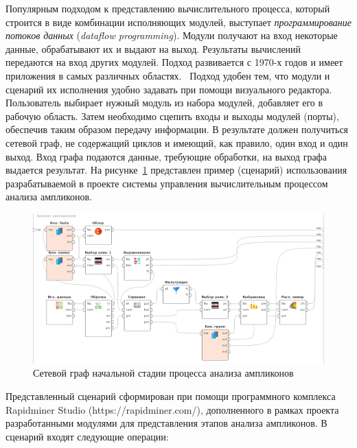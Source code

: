 \documentclass[a4paper,12pt,openany,final]{extreport}
\def\oldcaption{} \let\oldcaption=\caption
\def\caption{\stepcounter{captionsnum}\oldcaption}
\begin{document}
Популярным подходом к представлению вычислительного процесса, который
строится в виде комбинации исполняющих модулей, выступает
\emph{программирование потоков данных} (\emph{dataflow programming}).
Модули получают на вход некоторые данные, обрабатывают их и выдают на
выход. Результаты вычислений передаются на вход других модулей. Подход
развивается с 1970-х годов и имеет приложения в самых различных
областях. ~Подход удобен тем, что модули и сценарий их исполнения удобно
задавать при помощи визуального редактора. Пользователь выбирает нужный
модуль из набора модулей, добавляет его в рабочую область. Затем
необходимо сцепить входы и выходы модулей (порты), обеспечив таким
образом передачу информации. В результате должен получиться сетевой
граф, не содержащий циклов и имеющий, как правило, один вход и один
выход. Вход графа подаются данные, требующие обработки, на выход графа
выдается результат. На рисунке~\ref{fig:ampl-an} представлен пример (сценарий)
использования разрабатываемой в проекте системы управления
вычислительным процессом анализа ампликонов.~

\begin{figure}[htbp]\centering
\includegraphics[width=0.9\linewidth]{media/image14.png}
\caption{Сетевой граф начальной стадии процесса анализа ампликонов}
\label{fig:ampl-an}
\end{figure}

Представленный сценарий сформирован при помощи программного комплекса
Rapidminer Studio (https://rapidminer.com/), дополненного в рамках
проекта разработанными модулями для представления этапов анализа
ампликонов. В сценарий входят следующие операции:
\end{document}

